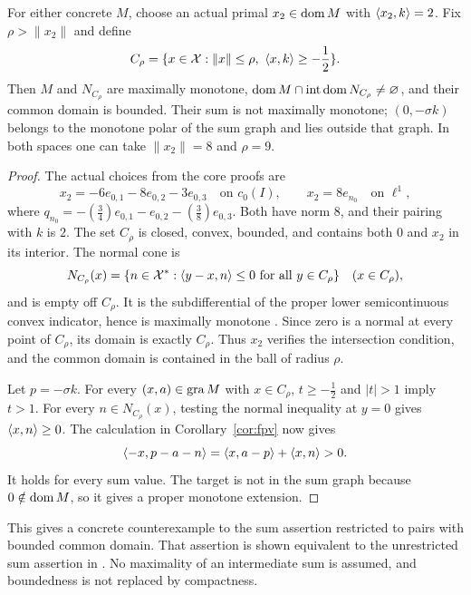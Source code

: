\begin{corollary}\label{cor:normal}
For either concrete $M$, choose an actual primal $x_2\in\operatorname{dom} M$ with
$\langle x_2,k\rangle=2$. Fix $\rho>\|x_2\|$ and define
\begin{equation}
C_\rho=\{x\in\mathcal X:\|x\|\le\rho,\ \langle x,k\rangle\ge-\frac{1}{2}\}.
\label{eq:cor-cut}
\end{equation}
Then $M$ and $N_{C_\rho}$ are maximally monotone,
$\operatorname{dom} M\cap\operatorname{int}\operatorname{dom} N_{C_\rho}\ne\varnothing$, and
their common domain is bounded. Their sum is not maximally monotone;
$(0,-\sigma k)$ belongs to the monotone polar of the sum graph
and lies outside that graph.
In both spaces one can take $\|x_2\|=8$ and $\rho=9$.
\end{corollary}
\begin{proof}
The actual choices from the core proofs are
\[
x_2=-6e_{0,1}-8e_{0,2}-3e_{0,3}\quad\text{on }c_0(I),
\qquad x_2=8e_{n_0}\quad\text{on }\ell^1,
\]
where $q_{n_0}=-(\frac{3}{4})e_{0,1}-e_{0,2}-(\frac{3}{8})e_{0,3}$. Both have norm
$8$, and their pairing with $k$ is $2$. The set $C_\rho$ is closed,
convex, bounded, and contains both $0$ and
$x_2$ in its interior. The normal cone is
\[
N_{C_\rho}(x)=\{n\in\mathcal X^*:
\langle y-x,n\rangle\le0\ \text{for all }y\in C_\rho\}
\quad(x\in C_\rho),
\]
and is empty off $C_\rho$. It is the subdifferential of the proper
lower semicontinuous convex indicator, hence is maximally monotone
\cite[Theorem~A]{rockafellar1970subdiff}. Since zero is a normal at
every point of $C_\rho$, its domain is exactly $C_\rho$.
Thus $x_2$ verifies the intersection condition, and the common domain
is contained in the ball of radius $\rho$.

Let $p=-\sigma k$. For every $(x,a)\in\operatorname{gra} M$ with $x\in C_\rho$,
$t\ge-\frac{1}{2}$ and $|t|>1$ imply $t>1$. For every $n\in N_{C_\rho}(x)$,
testing the normal inequality at $y=0$ gives $\langle x,n\rangle\ge0$.
The calculation in Corollary~\ref{cor:fpv} now gives
\[
\langle -x,p-a-n\rangle=\langle x,a-p\rangle+\langle x,n\rangle>0.
\]
It holds for every sum value. The target is not in the sum graph because
$0\notin\operatorname{dom} M$, so it gives a proper monotone extension.
\end{proof}
This gives a concrete counterexample to the sum assertion restricted to
pairs with bounded common domain. That assertion is shown equivalent to
the unrestricted sum assertion in \cite[Theorem~2]{botbuenosimons2016}. No maximality of an intermediate
sum is assumed, and boundedness is not replaced by compactness.

